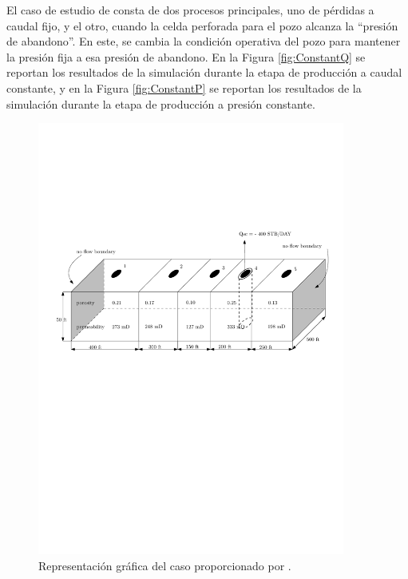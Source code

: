 El caso de estudio de \cite{jamal2006petroleum} consta de dos procesos principales, uno de pérdidas a caudal fijo, y el otro, cuando la celda perforada para el pozo alcanza la ``presión de abandono''. En este, se cambia la condición operativa del pozo para mantener la presión fija a esa presión de abandono. En la Figura \ref{fig:ConstantQ} se reportan los resultados de la simulación durante la etapa de producción a caudal constante, y en la Figura \ref{fig:ConstantP} se reportan los resultados de la simulación durante la etapa de producción a presión constante.
\begin{figure}[h!]
	\centering
	\includegraphics[width=0.9\textwidth]{Fig/casoasis.pdf}
	\caption{Representación gráfica del caso proporcionado por \cite{jamal2006petroleum}.}
	\label{fig:Abou-Kassem}
\end{figure}



